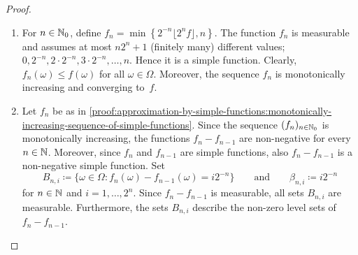 \begin{proof}
\begin{enumerate}[label=(\roman*)]
\item \label{proof:approximation-by-simple-functions:monotonically-increasing-sequence-of-simple-functions}
For $n \in \mathbb{N}_0$, define
\(
f_n = \min\left\{2^{-n}\lfloor 2^n f \rfloor, n\right\}
\).
The function $f_n$ is measurable %
 and assumes at most $n2^n+1$ (finitely many) different values; $0, 2^{-n}, 2\cdot 2^{-n}, 3\cdot 2^{-n}, \ldots, n$.
Hence it is a simple function.
Clearly, $f_n(\omega) \leq f(\omega)$ for all $\omega \in \Omega$.
Moreover, the sequence $f_n$ is monotonically increasing and converging to~$f$.



\item 
Let $f_n$ be as in \ref{proof:approximation-by-simple-functions:monotonically-increasing-sequence-of-simple-functions}.
Since the sequence $(f_n)_{n \in \mathbb{N}_0}$ is monotonically increasing, the functions $f_n-f_{n-1}$ are non-negative for every $n \in \mathbb{N}$.
Moreover, since $f_n$ and $f_{n-1}$ are simple functions, also $f_n-f_{n-1}$ is a non-negative simple function.
Set
\[
B_{n,i} \coloneq \{\omega \in \Omega : f_n(\omega)-f_{n-1}(\omega) = i2^{-n}\}
\qquad
\text{and}
\qquad
\beta_{n,i} \coloneq i2^{-n}
\]
for $n \in \mathbb{N}$ and $i = 1,\ldots,2^n$.
Since $f_n-f_{n-1}$ is measurable, all sets $B_{n,i}$ are measurable. %
Furthermore, the sets $B_{n,i}$ describe the non-zero level sets of $f_n-f_{n-1}$.

\end{enumerate}
\end{proof}
